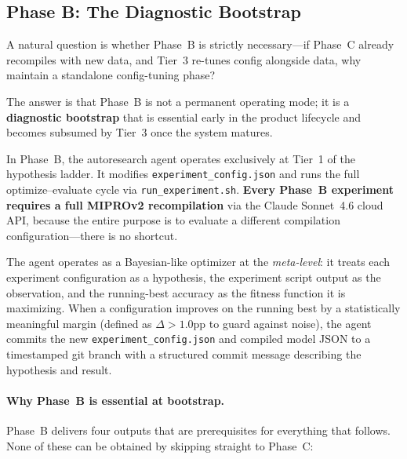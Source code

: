 \documentclass[11pt]{article}
\begin{document}
\subsection{Phase B: The Diagnostic Bootstrap}

A natural question is whether Phase~B is strictly necessary---if Phase~C
already recompiles with new data, and Tier~3 re-tunes config alongside
data, why maintain a standalone config-tuning phase?

The answer is that Phase~B is not a permanent operating mode; it is a
\textbf{diagnostic bootstrap} that is essential early in the product
lifecycle and becomes subsumed by Tier~3 once the system matures.

In Phase~B, the autoresearch agent operates exclusively at Tier~1 of
the hypothesis ladder. It modifies \texttt{experiment\_config.json}
and runs the full optimize--evaluate cycle via \texttt{run\_experiment.sh}.
\textbf{Every Phase~B experiment requires a full MIPROv2 recompilation}
via the Claude Sonnet~4.6 cloud API, because the entire purpose is to
evaluate a different compilation configuration---there is no shortcut.

The agent operates as a Bayesian-like optimizer at the \emph{meta-level}:
it treats each experiment configuration as a hypothesis, the experiment
script output as the observation, and the running-best accuracy as the
fitness function it is maximizing. When a configuration improves on the
running best by a statistically meaningful margin (defined as $\Delta > 1.0$pp
to guard against noise), the agent commits the new \texttt{experiment\_config.json}
and compiled model JSON to a timestamped git branch with a structured
commit message describing the hypothesis and result.

\paragraph{Why Phase~B is essential at bootstrap.}

Phase~B delivers four outputs that are prerequisites for everything
that follows. None of these can be obtained by skipping straight to
Phase~C:
\end{document}
